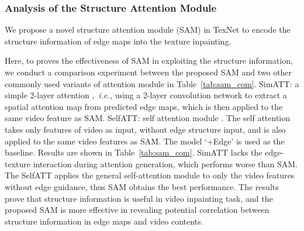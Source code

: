 \subsubsection{Analysis of the Structure Attention Module}
We propose a novel structure attention module (SAM) in TexNet to encode the structure information of edge maps into the texture inpainting. 
{\color{blue}
Here, to proves the effectiveness of SAM in exploiting the structure information, we conduct a comparison experiment between the proposed SAM and two other commonly used variants of attention module in Table~\ref{tab:sam_com}. SimATT: a simple 2-layer attention \cite{min2019two},~\emph{i.e.,} using a 2-layer convolution network to extract a spatial attention map from predicted edge maps, which is then applied to the same video feature as SAM. SelfATT: self attention module \cite{vaswani2017attention}. The self attention takes only features of video as input, without edge structure input, and is also applied to the same video features as SAM.   The model `+Edge' is used as the baseline. Results are shown in Table~\ref{tab:sam_com}. SimATT lacks the edge-texture interaction during attention generation, which performs worse than SAM. The SelfATT applies the general self-attention module to only the video features without edge guidance, thus SAM obtains the best performance. The results prove that structure information is useful in video inpainting task, and the proposed SAM is more effective in revealing potential correlation between structure information in edge maps and video contents.
	
}



